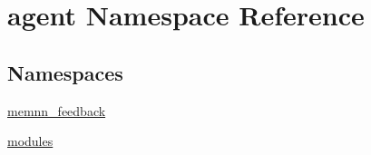 \hypertarget{namespaceagent}{}\section{agent Namespace Reference}
\label{namespaceagent}
\subsection*{Namespaces}
\begin{DoxyCompactItemize}
\item 
 \hyperlink{namespaceagent_1_1memnn__feedback}{memnn\+\_\+feedback}
\item 
 \hyperlink{namespaceagent_1_1modules}{modules}
\end{DoxyCompactItemize}

